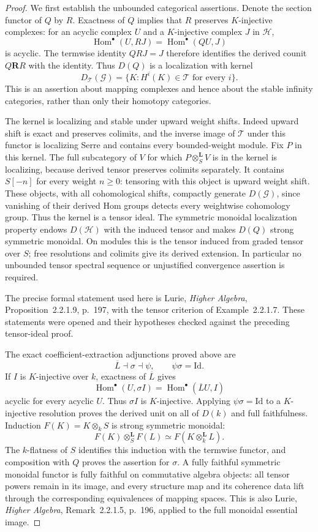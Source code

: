 \begin{proof}
We first establish the unbounded categorical assertions. Denote the
section functor of $Q$ by $R$. Exactness of $Q$ implies that $R$
preserves $K$-injective complexes: for an acyclic complex $U$ and a
$K$-injective complex $J$ in $\mathcal H$,
\[
 \operatorname{Hom}^{\bullet}(U,RJ)
 =\operatorname{Hom}^{\bullet}(QU,J)
\]
is acyclic. The termwise identity $QRJ=J$ therefore identifies the
derived counit $Q\mathbf RR$ with the identity. Thus $D(Q)$ is a
localization with kernel
\[
 D_{\mathcal T}(\mathcal G)
 =\{K:H^i(K)\in\mathcal T\text{ for every }i\}.
\]
This is an assertion about mapping complexes and hence about the stable
infinity categories, rather than only their homotopy categories.

The kernel is localizing and stable under upward weight shifts.
Indeed upward shift is exact and preserves colimits, and the inverse
image of $\mathcal T$ under this functor is localizing Serre and
contains every bounded-weight module. Fix $P$ in this kernel. The
full subcategory of $V$ for which $P\otimes_S^{\mathbf L}V$ is in the
kernel is localizing, because derived tensor preserves colimits
separately. It contains $S[-n]$ for every weight $n\geq0$: tensoring
with this object is upward weight shift. These objects, with all
cohomological shifts, compactly generate $D(\mathcal G)$, since
vanishing of their derived Hom groups detects every weightwise
cohomology group. Thus the kernel is a tensor ideal. The symmetric
monoidal localization property endows $D(\mathcal H)$ with the
induced tensor and makes $D(Q)$ strong symmetric monoidal. On modules
this is the tensor induced from graded tensor over $S$; free
resolutions and colimits give its derived extension. In particular no
unbounded tensor spectral sequence or unjustified convergence
assertion is required.

The precise formal statement used here is Lurie, \emph{Higher
Algebra}, Proposition~2.2.1.9, p.~197, with the tensor criterion of
Example~2.2.1.7. These statements were opened and their hypotheses
checked against the preceding tensor-ideal proof.

The exact coefficient-extraction adjunctions proved above are
\[
 \overline L\dashv\sigma\dashv\psi,
 \qquad\psi\sigma=\mathrm{Id}.
\]
If $I$ is $K$-injective over $k$, exactness of $\overline L$ gives
\[
 \operatorname{Hom}^{\bullet}(U,\sigma I)
 =\operatorname{Hom}^{\bullet}(\overline L U,I)
\]
acyclic for every acyclic $U$. Thus $\sigma I$ is $K$-injective.
Applying $\psi\sigma=\mathrm{Id}$ to a $K$-injective resolution
proves the derived unit on all of $D(k)$ and full faithfulness.
Induction $F(K)=K\otimes_k S$ is strong symmetric monoidal:
\[
 F(K)\otimes_S^{\mathbf L}F(L)
 \simeq F(K\otimes_k^{\mathbf L}L).
\]
The $k$-flatness of $S$ identifies this induction with the termwise
functor, and composition with $Q$ proves the assertion for $\sigma$.
A fully faithful symmetric monoidal functor is fully faithful on
commutative algebra objects: all tensor powers remain in its image,
and every structure map and its coherence data lift through the
corresponding equivalences of mapping spaces.
This is also Lurie, \emph{Higher Algebra}, Remark~2.2.1.5,
p.~196, applied to the full monoidal essential image.


\end{proof}
